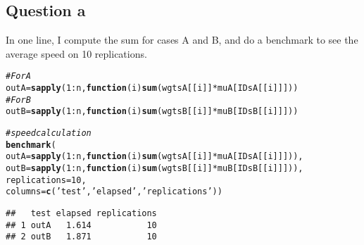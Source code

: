 \documentclass{llncs}\usepackage[]{graphicx}\usepackage[]{color}
\makeatletter
\newcommand{\hlnum}[1]{\textcolor[rgb]{0.686,0.059,0.569}{#1}}%
\newcommand{\hlstr}[1]{\textcolor[rgb]{0.192,0.494,0.8}{#1}}%
\newcommand{\hlcom}[1]{\textcolor[rgb]{0.678,0.584,0.686}{\textit{#1}}}%
\newcommand{\hlopt}[1]{\textcolor[rgb]{0,0,0}{#1}}%
\newcommand{\hlstd}[1]{\textcolor[rgb]{0.345,0.345,0.345}{#1}}%
\newcommand{\hlkwa}[1]{\textcolor[rgb]{0.161,0.373,0.58}{\textbf{#1}}}%
\newcommand{\hlkwb}[1]{\textcolor[rgb]{0.69,0.353,0.396}{#1}}%
\newcommand{\hlkwc}[1]{\textcolor[rgb]{0.333,0.667,0.333}{#1}}%
\newcommand{\hlkwd}[1]{\textcolor[rgb]{0.737,0.353,0.396}{\textbf{#1}}}%
\newenvironment{kframe}{%
 \def\at@end@of@kframe{}%
 \ifinner\ifhmode%
  \def\at@end@of@kframe{\end{minipage}}%
  \begin{minipage}{\columnwidth}%
 \fi\fi%
 \def\FrameCommand##1{\hskip\@totalleftmargin \hskip-\fboxsep
 \colorbox{shadecolor}{##1}\hskip-\fboxsep
     \hskip-\linewidth \hskip-\@totalleftmargin \hskip\columnwidth}%
 \MakeFramed {\advance\hsize-\width
   \@totalleftmargin\z@ \linewidth\hsize
   \@setminipage}}%
 {\par\unskip\endMakeFramed%
 \at@end@of@kframe}
\newenvironment{knitrout}{}{} %
\makeatother
\begin{document}
\subsection{Question a}
In one line, I compute the sum for cases A and B, and do a benchmark to see the average speed on 10 replications.
\begin{knitrout}
\color{fgcolor}\begin{kframe}
\begin{alltt}
\hlcom{# For A}
\hlstd{outA} \hlkwb{=} \hlkwd{sapply}\hlstd{(}\hlnum{1}\hlopt{:}\hlstd{n,}\hlkwa{function}\hlstd{(}\hlkwc{i}\hlstd{)} \hlkwd{sum}\hlstd{(wgtsA[[i]]}\hlopt{*}\hlstd{muA[IDsA[[i]]]))}
\hlcom{# For B}
\hlstd{outB} \hlkwb{=} \hlkwd{sapply}\hlstd{(}\hlnum{1}\hlopt{:}\hlstd{n,}\hlkwa{function}\hlstd{(}\hlkwc{i}\hlstd{)} \hlkwd{sum}\hlstd{(wgtsB[[i]]}\hlopt{*}\hlstd{muB[IDsB[[i]]]))}

\hlcom{# speed calculation}
\hlkwd{benchmark}\hlstd{(}
  \hlkwc{outA}\hlstd{=}\hlkwd{sapply}\hlstd{(}\hlnum{1}\hlopt{:}\hlstd{n,}\hlkwa{function}\hlstd{(}\hlkwc{i}\hlstd{)} \hlkwd{sum}\hlstd{(wgtsA[[i]]}\hlopt{*}\hlstd{muA[IDsA[[i]]])),}
  \hlkwc{outB}\hlstd{=}\hlkwd{sapply}\hlstd{(}\hlnum{1}\hlopt{:}\hlstd{n,}\hlkwa{function}\hlstd{(}\hlkwc{i}\hlstd{)} \hlkwd{sum}\hlstd{(wgtsB[[i]]}\hlopt{*}\hlstd{muB[IDsB[[i]]])),}
  \hlkwc{replications} \hlstd{=} \hlnum{10}\hlstd{,}
  \hlkwc{columns}\hlstd{=}\hlkwd{c}\hlstd{(}\hlstr{'test'}\hlstd{,} \hlstr{'elapsed'}\hlstd{,} \hlstr{'replications'}\hlstd{))}
\end{alltt}
\begin{lstlisting}[basicstyle=\ttfamily,breaklines=true]
##   test elapsed replications
## 1 outA   1.614           10
## 2 outB   1.871           10
\end{lstlisting}
\end{kframe}
\end{knitrout}
\end{document}
